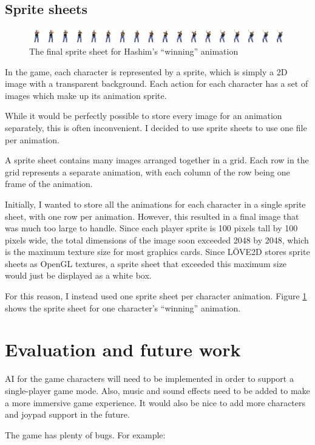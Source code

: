 \documentclass[11pt]{article}
\begin{document}
\subsection{Sprite sheets}\label{sec:sprites}
\begin{figure}[tp]
\centering
\includegraphics[width=1.0\textwidth]{win.png}
\caption{The final sprite sheet for Hashim's ``winning'' animation}
\label{fig:win}
\end{figure}
In the game, each character is represented by a sprite, which is simply a 2D image with a transparent background. Each action for each character has a set of images which make up its animation sprite.

While it would be perfectly possible to store every image for an animation separately, this is often inconvenient. I decided to use sprite sheets to use one file per animation.

A sprite sheet contains many images arranged together in a grid. Each row in the grid represents a separate animation, with each column of the row being one frame of the animation.

Initially, I wanted to store all the animations for each character in a single sprite sheet, with one row per animation. However, this resulted in a final image that was much too large to handle. Since each player sprite is 100 pixels tall by 100 pixels wide, the total dimensions of the image soon exceeded 2048 by 2048, which is the maximum texture size for most graphics cards. Since L\"{O}VE2D stores sprite sheets as OpenGL textures, a sprite sheet that exceeded this maximum size would just be displayed as a white box.

For this reason, I instead used one sprite sheet per character animation. Figure \ref{fig:win} shows the sprite sheet for one character's ``winning'' animation.

\section{Evaluation and future work}
AI for the game characters will need to be implemented in order to support a single-player game mode. Also, music and sound effects need to be added to make a more immersive game experience. It would also be nice to add more characters and joypad support in the future.

The game has plenty of bugs. For example:
\end{document}
